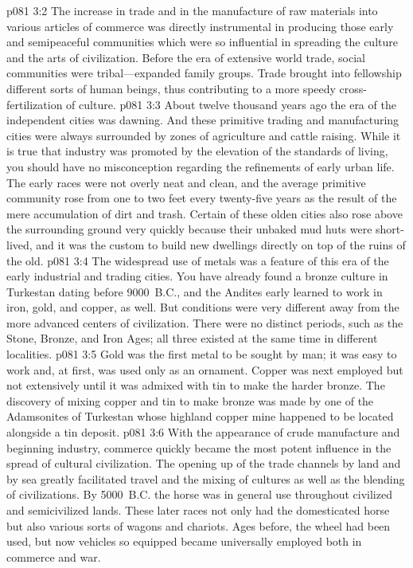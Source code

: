 \vs p081 3:2 The increase in trade and in the manufacture of raw materials into various articles of commerce was directly instrumental in producing those early and semipeaceful communities which were so influential in spreading the culture and the arts of civilization. Before the era of extensive world trade, social communities were tribal---expanded family groups. Trade brought into fellowship different sorts of human beings, thus contributing to a more speedy cross\hyp{}fertilization of culture.
\vs p081 3:3 About twelve thousand years ago the era of the independent cities was dawning. And these primitive trading and manufacturing cities were always surrounded by zones of agriculture and cattle raising. While it is true that industry was promoted by the elevation of the standards of living, you should have no misconception regarding the refinements of early urban life. The early races were not overly neat and clean, and the average primitive community rose from one to two feet every twenty\hyp{}five years as the result of the mere accumulation of dirt and trash. Certain of these olden cities also rose above the surrounding ground very quickly because their unbaked mud huts were short\hyp{}lived, and it was the custom to build new dwellings directly on top of the ruins of the old.\plusone
\pc \vs p081 3:4 The widespread use of metals was a feature of this era of the early industrial and trading cities. You have already found a bronze culture in Turkestan dating before 9000~B.C., and the Andites early learned to work in iron, gold, and copper, as well. But conditions were very different away from the more advanced centers of civilization. There were no distinct periods, such as the Stone, Bronze, and Iron Ages; all three existed at the same time in different localities.
\vs p081 3:5 Gold was the first metal to be sought by man; it was easy to work and, at first, was used only as an ornament. Copper was next employed but not extensively until it was admixed with tin to make the harder bronze. The discovery of mixing copper and tin to make bronze was made by one of the Adamsonites of Turkestan whose highland copper mine happened to be located alongside a tin deposit.
\pc \vs p081 3:6 With the appearance of crude manufacture and beginning industry, commerce quickly became the most potent influence in the spread of cultural civilization. The opening up of the trade channels by land and by sea greatly facilitated travel and the mixing of cultures as well as the blending of civilizations. By 5000~B.C. the horse was in general use throughout civilized and semicivilized lands. These later races not only had the domesticated horse but also various sorts of wagons and chariots. Ages before, the wheel had been used, but now vehicles so equipped became universally employed both in commerce and war.
